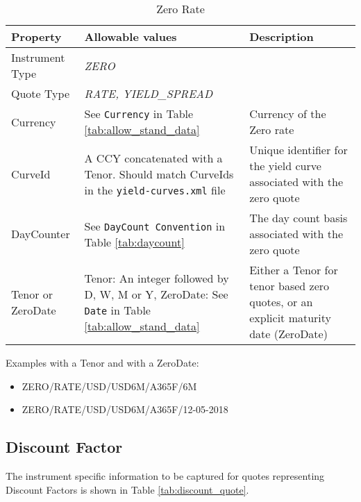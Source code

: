 \begin{table}[H]
\centering
  \begin{tabular}{|p{3.3cm}|p{5cm}|p{7cm}|}
    \hline
    {\bf Property} & {\bf Allowable values} & {\bf Description} \\ \hline
    Instrument Type & \emph{ZERO} & \\ \hline
    Quote Type & \emph{RATE, YIELD\_SPREAD} & \\ \hline
    Currency & See \lstinline!Currency! in Table \ref{tab:allow_stand_data} & Currency of the Zero rate\\ \hline
    CurveId& A CCY concatenated with a Tenor. Should match CurveIds in the {\tt yield-curves.xml} file & Unique identifier for the yield curve associated with the zero quote\\ \hline
    DayCounter & See \lstinline!DayCount Convention! in Table \ref{tab:daycount} & The day count basis associated with the zero quote \\ \hline
    Tenor or ZeroDate & Tenor: An integer followed by D, W, M or Y, ZeroDate: See \lstinline!Date! in Table \ref{tab:allow_stand_data} & Either a Tenor for tenor based zero quotes, or an explicit maturity date (ZeroDate)\\ \hline
  \end{tabular}
  \caption{Zero Rate}
  \label{tab:zero_quote}
\end{table}



\medskip
Examples with a Tenor and with a ZeroDate:
\begin{itemize}
\item {ZERO/RATE/USD/USD6M/A365F/6M}
\item {ZERO/RATE/USD/USD6M/A365F/12-05-2018}
\end{itemize}


\subsection{Discount Factor}\label{ss:discount_rate}

The instrument specific information to be captured for quotes representing Discount Factors is shown in Table
\ref{tab:discount_quote}.


